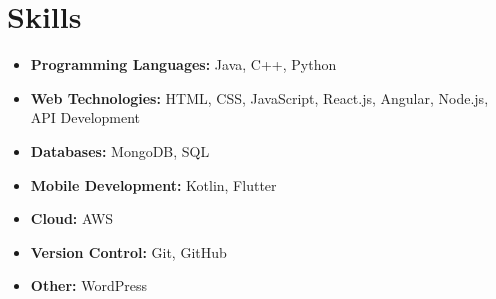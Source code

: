 \documentclass[a4paper,11pt]{article}
\begin{document}
\section*{Skills}
\begin{itemize}[leftmargin=*]
  \item \textbf{Programming Languages:} Java, C++, Python
  \item \textbf{Web Technologies:} HTML, CSS, JavaScript, React.js, Angular, Node.js, API Development
  \item \textbf{Databases:} MongoDB, SQL
  \item \textbf{Mobile Development:} Kotlin, Flutter
  \item \textbf{Cloud:} AWS
  \item \textbf{Version Control:} Git, GitHub
  \item \textbf{Other:} WordPress
\end{itemize}

\end{document}
